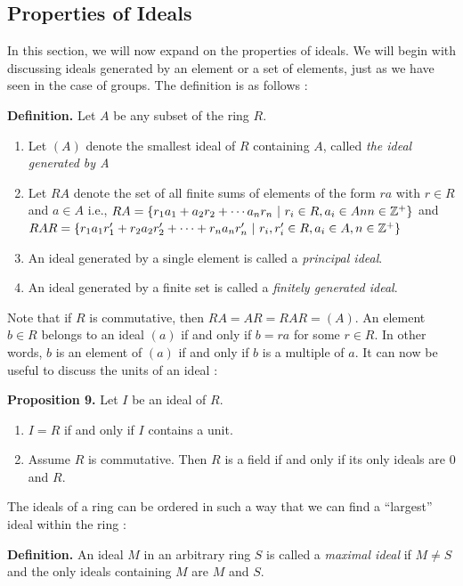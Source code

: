 \documentclass[11pt, reqno]{amsart}
\theoremstyle{plain}
\theoremstyle{definition}
\theoremstyle{example}
\begin{document}
\subsection{Properties of Ideals}

In this section, we will now expand on the properties of ideals. We will begin with discussing ideals generated by an element or a set of elements, just as we have seen in the case of groups. The definition is as follows \cite[\S 7.4, p. 251]{dummit}:

\par
\textbf{Definition.} Let $A$ be any subset of the ring $R$.
\begin{enumerate}
\item Let $(A)$ denote the smallest ideal of $R$ containing $A$, called \textit{the ideal generated by A}
\item Let $RA$ denote the set of all finite sums of elements of the form $ra$ with $r \in R$ and $a \in A$ i.e., $RA = \{r_1a_1 + a_2r_2 + \cdots a_nr_n \ | \ r_i \in R, a_i \in An n \in \mathbb{Z}^+\}$ and $RAR = \{r_1a_1r_1' + r_2a_2r_2' + \cdots + r_na_nr_n' \ | \ r_i, r_i' \in R, a_i \in A, n \in \mathbb{Z}^+\}$
\item An ideal generated by a single element is called a \textit{principal ideal}.
\item An ideal generated by a finite set is called a \textit{finitely generated ideal}.
\end{enumerate}

Note that if $R$ is commutative, then $RA = AR = RAR = (A)$. An element $b \in R$ belongs to an ideal $(a)$ if and only if $b = ra$ for some $r \in R$. In other words, $b$ is an element of $(a)$ if and only if $b$ is a multiple of $a$. It can now be useful to discuss the units of an ideal \cite[\S 7.4, p. 253]{dummit}:

\par
\textbf{Proposition 9.} Let $I$ be an ideal of $R$.
\begin{enumerate}
\item $I = R$ if and only if $I$ contains a unit.
\item Assume $R$ is commutative. Then $R$ is a field if and only if its only ideals are $0$ and $R$.
\end{enumerate}

The ideals of a ring can be ordered in such a way that we can find a ``largest'' ideal within the ring \cite[\S 7.4, p. 253-254]{dummit}:

\par
\textbf{Definition.} An ideal $M$ in an arbitrary ring $S$ is called a \textit{maximal ideal} if $M \neq S$ and the only ideals containing $M$ are $M$ and $S$.
\end{document}
